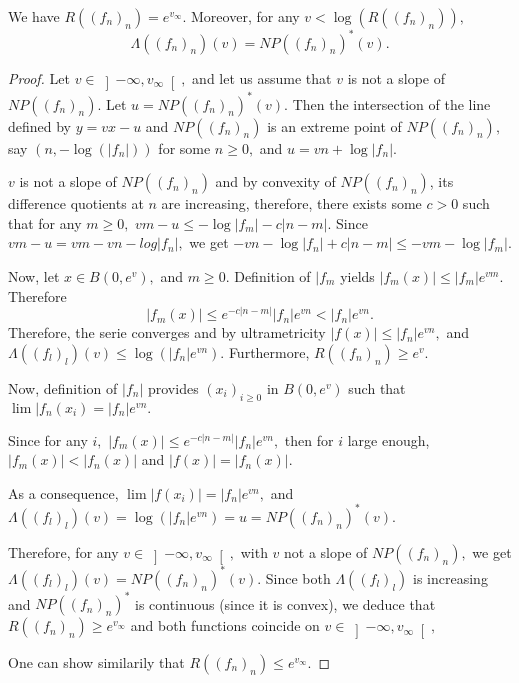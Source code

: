 \documentclass{lms}
\begin{document}
\begin{prop} \label{prop : connexion sup Newton}
We have $R((f_n)_n) = e^{v_{\infty}}.$
Moreover, for any $v < \log \left( R((f_n)_n) \right),$ \[ \Lambda ((f_n)_n) (v) = NP((f_n)_n)^*(v).\]
\end{prop}
\begin{proof}
Let $v \in \left] -\infty,v_{\infty} \right[,$ and let us assume that $v$ is not a slope of $NP((f_n)_n).$
Let $u = NP((f_n)_n)^*(v).$ Then the intersection of the line defined by $y=vx-u$ and $NP((f_n)_n)$ is an extreme point of $NP((f_n)_n),$ say $(n, - \log ( \vert f_n \vert ))$ for some $n \geq 0,$ and $u = vn + \log \vert f_n \vert.$

$v$ is not a slope of $NP((f_n)_n)$ and by convexity of $NP((f_n)_n)$, its difference quotients at $n$ are increasing, therefore, there exists some $c>0$ such that for any $m\geq 0,$ $vm-u \leq - \log \vert f_m \vert - c \vert n-m \vert.$ Since $vm-u=vm-vn-log \vert f_n \vert,$ we get $-vn-\log \vert f_n \vert + c \vert n-m \vert  \leq -vm-\log \vert f_m \vert .$

Now, let $x \in  B(0,e^v),$ and $m \geq 0.$ Definition of $\vert f_m$ yields $ \vert f_m (x) \vert \leq \vert f_m \vert e^{vm}.$ Therefore \[\vert f_m (x) \vert \leq e^{-c \vert n-m \vert } \vert f_n \vert  e^{vn}< \vert f_n \vert e^{vn}.\]
Therefore, the serie converges and by ultrametricity $ \vert f(x) \vert \leq \vert f_n \vert e^{vn},$ and $\Lambda ((f_l)_l)(v) \leq \log \left( \vert f_n \vert e^{vn} \right).$ Furthermore,  $R((f_n)_n)  \geq e^v.$
 

Now, definition of $\vert f_n \vert$  provides $(x_i)_{i\geq 0}$ in $B(0,e^v)$ such that $\lim \vert f_n (x_i)= \vert f_n \vert e^{vn}.$ 

Since for any $i,$ $\vert f_m (x) \vert \leq e^{-c \vert n-m \vert } \vert f_n \vert  e^{vn},$ then for $i$ large enough, $\vert f_m (x) \vert < \vert f_n (x) \vert $ and $\vert f(x) \vert = \vert f_n (x) \vert.$

As a consequence, $\lim \vert f(x_i) \vert = \vert f_n \vert e^{vn},$ and  $\Lambda ((f_l)_l)(v) = \log ( \vert f_n \vert e^{vn}) = u= NP((f_n)_n)^*(v).$

Therefore, for any $v \in \left] -\infty,v_{\infty} \right[,$ with $v$ not a slope of $NP((f_n)_n),$ we get $\Lambda ((f_l)_l)(v) =NP((f_n)_n)^*(v).$
Since both $\Lambda ((f_l)_l)$ is increasing and $NP((f_n)_n)^*$ is continuous (since it is convex), we deduce that $R((f_n)_n) \geq  e^{v_{\infty}}$ and both functions coincide on $v \in \left] -\infty,v_{\infty} \right[,$

One can show similarily that $R((f_n)_n) \leq  e^{v_{\infty}}.$
\end{proof}
\end{document}
